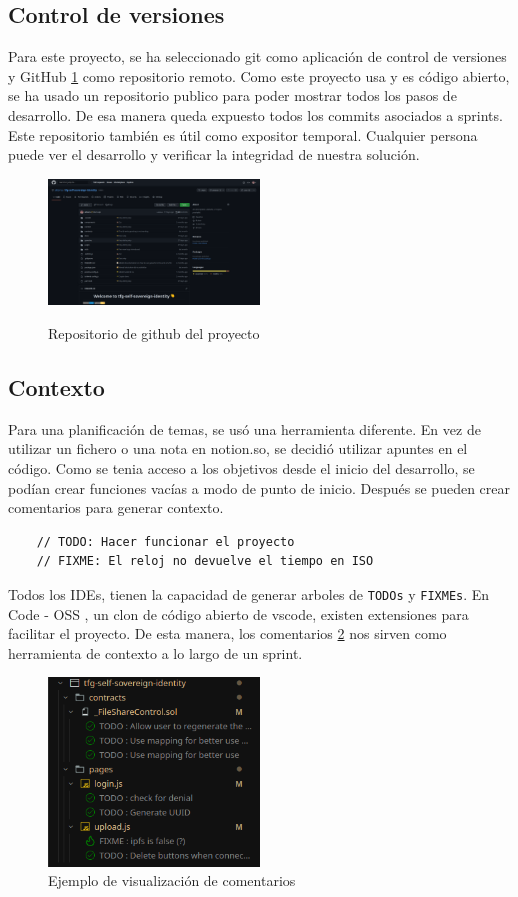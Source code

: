 \subsection{Control de versiones}
Para este proyecto, se ha seleccionado git como aplicación de control de versiones y GitHub \ref{fg:github} como repositorio remoto. Como este proyecto usa y es código abierto, se ha usado un repositorio publico para poder mostrar todos los pasos de desarrollo. De esa manera queda expuesto todos los commits asociados a sprints.
Este repositorio también es útil como expositor temporal. Cualquier persona puede ver el desarrollo y verificar la integridad de nuestra solución.
\begin{figure}
    \centering
    \includegraphics[width=0.5\textwidth]{Figures/github.png}
    \caption{Repositorio de github del proyecto}
    \label{fg:github}
    \cite{web:repo}
\end{figure}
\subsection{Contexto}
Para una planificación de temas, se usó una herramienta diferente. En vez de utilizar un fichero o una nota en notion.so, se decidió utilizar apuntes en el código. Como se tenia acceso a los objetivos desde el inicio del desarrollo, se podían crear funciones vacías a modo de punto de inicio. Después se pueden crear comentarios para generar contexto.
\begin{lstlisting}
    // TODO: Hacer funcionar el proyecto
    // FIXME: El reloj no devuelve el tiempo en ISO
\end{lstlisting}
Todos los IDEs, tienen la capacidad de generar arboles de \verb|TODOs| y \verb|FIXMEs|. En Code - OSS \cite{web:code-oss}, un clon de código abierto de vscode, existen extensiones para facilitar el proyecto.
De esta manera, los comentarios \ref{fg:todoTree} nos sirven como herramienta de contexto a lo largo de un sprint.
\begin{figure}[h!]
    \centering
    \includegraphics[width=0.5\textwidth]{Figures/TodoTree.png}
    \caption{Ejemplo de visualización de comentarios}
    \label{fg:todoTree}
\end{figure}
\newpage
\thispagestyle{empty}